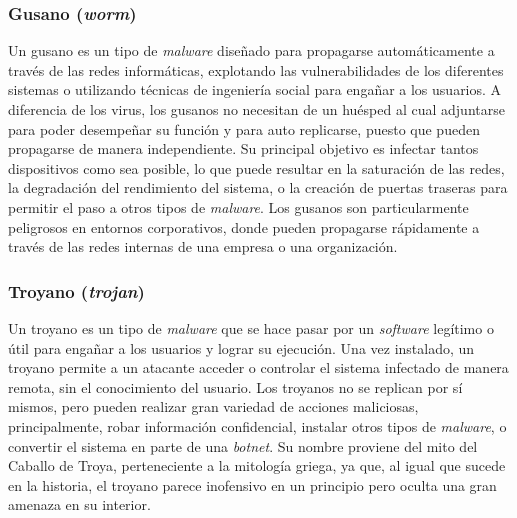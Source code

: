 \subsubsection{Gusano (\textit{worm})}
Un gusano es un tipo de \textit{malware} diseñado para propagarse automáticamente a través de las redes informáticas, explotando las vulnerabilidades de los diferentes sistemas o utilizando técnicas de ingeniería social para engañar a los usuarios. A diferencia de los virus, los gusanos no necesitan de un huésped al cual adjuntarse para poder desempeñar su función y para auto replicarse, puesto que pueden propagarse de manera independiente. Su principal objetivo es infectar tantos dispositivos como sea posible, lo que puede resultar en la saturación de las redes, la degradación del rendimiento del sistema, o la creación de puertas traseras para permitir el paso a otros tipos de \textit{malware}. Los gusanos son particularmente peligrosos en entornos corporativos, donde pueden propagarse rápidamente a través de las redes internas de una empresa o una organización.

\subsubsection{Troyano (\textit{trojan})}
Un troyano es un tipo de \textit{malware} que se hace pasar por un \textit{software} legítimo o útil para engañar a los usuarios y lograr su ejecución. Una vez instalado, un troyano permite a un atacante acceder o controlar el sistema infectado de manera remota, sin el conocimiento del usuario. Los troyanos no se replican por sí mismos, pero pueden realizar gran variedad de acciones maliciosas, principalmente, robar información confidencial, instalar otros tipos de \textit{malware}, o convertir el sistema en parte de una \textit{botnet}. Su nombre proviene del mito del Caballo de Troya, perteneciente a la mitología griega, ya que, al igual que sucede en la historia, el troyano parece inofensivo en un principio pero oculta una gran amenaza en su interior.

